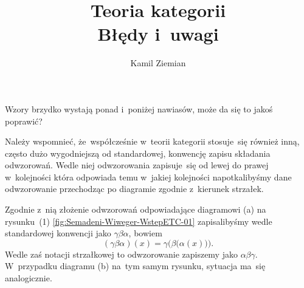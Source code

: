 \documentclass[a4paper,11pt]{article}
\title{Teoria kategorii \\
  {\Large Błędy i~uwagi}}
\author{Kamil Ziemian}
\begin{document}





\maketitle %






\vspace{0em}



\vspace{0em}




\noindent
{} Wzory brzydko wystają ponad i~poniżej nawiasów,
może da się to jakoś poprawić?

\vspace{\spaceFour}





\noindent
{} Należy wspomnieć, że~współcześnie w~teorii kategorii stosuje~się
również inną, często dużo wygodniejszą od standardowej, konwencję zapisu
składania odwzorowań. Wedle niej odwzorowania zapisuje~się od lewej do
prawej w~kolejności która odpowiada temu w~jakiej kolejności napotkalibyśmy
dane odwzorowanie przechodząc po diagramie zgodnie z~kierunek strzałek.

Zgodnie z~nią złożenie odwzorowań odpowiadające diagramowi (a) na
rysunku~(1) \eqref{fig:Semadeni-Wiweger-WstepETC-01} zapisalibyśmy wedle
standardowej konwencji jako $\gamma \beta \alpha$, bowiem
\begin{equation}
  \label{eq:Semadeni-Wiweger-WstepETC-01}
  ( \gamma \beta \alpha )( x ) = \gamma\big( \beta\big( \alpha( x ) \big) \big).
\end{equation}
Wedle zaś notacji strzałkowej to odwzorowanie zapiszemy jako $\alpha \beta \gamma$.
W~przypadku diagramu (b) na~tym samym rysunku, sytuacja ma~się analogicznie.
\end{document}
